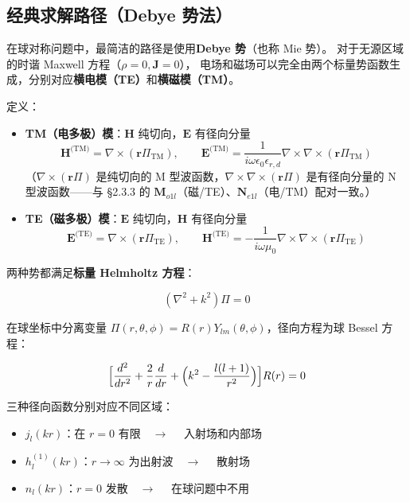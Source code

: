 \subsection{经典求解路径（Debye 势法）}

在球对称问题中，最简洁的路径是使用\textbf{Debye 势}（也称 Mie 势）。
对于无源区域的时谐 Maxwell 方程（$\rho=0,\mathbf{J}=0$），
电场和磁场可以完全由两个标量势函数生成，分别对应\textbf{横电模（TE）}和\textbf{横磁模（TM）}。

定义：

\begin{itemize}
  \item \textbf{TM（电多极）模}：$\mathbf{H}$ 纯切向，$\mathbf{E}$ 有径向分量
    \begin{equation}
      \mathbf{H}^{\text{(TM)}} = \nabla\times(\mathbf{r}\Pi_{\text{TM}}),\qquad
      \mathbf{E}^{\text{(TM)}} = \frac{1}{i\omega\epsilon_0\epsilon_{r,d}}\nabla\times\nabla\times(\mathbf{r}\Pi_{\text{TM}})
    \end{equation}
    （$\nabla\times(\mathbf{r}\Pi)$ 是纯切向的 M 型波函数，$\nabla\times\nabla\times(\mathbf{r}\Pi)$
    是有径向分量的 N 型波函数——与 \S2.3.3 的 $\mathbf{M}_{o1l}$（磁/TE）、$\mathbf{N}_{e1l}$（电/TM）配对一致。）
  \item \textbf{TE（磁多极）模}：$\mathbf{E}$ 纯切向，$\mathbf{H}$ 有径向分量
    \begin{equation}
      \mathbf{E}^{\text{(TE)}} = \nabla\times(\mathbf{r}\Pi_{\text{TE}}),\qquad
      \mathbf{H}^{\text{(TE)}} = -\frac{1}{i\omega\mu_0}\nabla\times\nabla\times(\mathbf{r}\Pi_{\text{TE}})
    \end{equation}
\end{itemize}

两种势都满足\textbf{标量 Helmholtz 方程}：

\begin{equation}
  (\nabla^2 + k^2)\Pi = 0
\end{equation}

在球坐标中分离变量 $\Pi(r,\theta,\phi) = R(r)Y_{lm}(\theta,\phi)$，径向方程为球 Bessel 方程：

\begin{equation}
  \Bigl[\frac{d^2}{dr^2} + \frac{2}{r}\frac{d}{dr} + \Bigl(k^2 - \frac{l(l+1)}{r^2}\Bigr)\Bigr]R(r) = 0
\end{equation}

三种径向函数分别对应不同区域：
\begin{itemize}
  \item $j_l(kr)$：在 $r=0$ 有限$\quad\to\quad$ 入射场和内部场
  \item $h_l^{(1)}(kr)$：$r\to\infty$ 为出射波$\quad\to\quad$ 散射场
  \item $n_l(kr)$：$r=0$ 发散$\quad\to\quad$ 在球问题中不用
\end{itemize}

